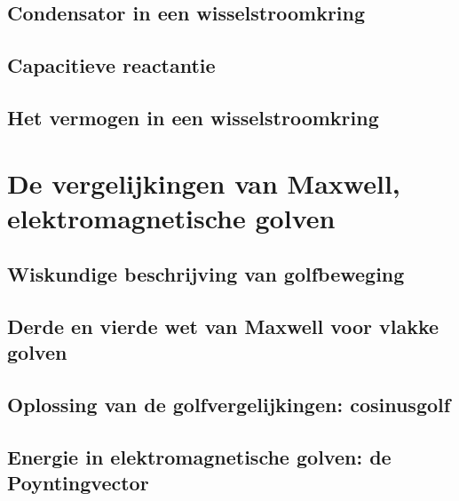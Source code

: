 \documentclass[12pt,a4paper]{article}
\begin{document}
    \subsection{Condensator in een wisselstroomkring}
    \subsection{Capacitieve reactantie}
    \subsection{Het vermogen in een wisselstroomkring}
      
    \section{De vergelijkingen van Maxwell, elektromagnetische golven}
    \subsection{Wiskundige beschrijving van golfbeweging}
    \subsection{Derde en vierde wet van Maxwell voor vlakke golven}
    \subsection{Oplossing van de golfvergelijkingen: cosinusgolf}
    \subsection{Energie in elektromagnetische golven: de Poyntingvector}
    
\end{document}
